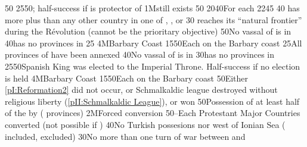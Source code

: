 {}{50}{}%
%
%
{25}{50}{; half-success if \paysmajeurSuede is
  protector of \paysPologne}%
%
%
\EUobjective1M{\payspologne still exists}{}%
{}{50}{}%
%
%
{20}{40}{For each }%
%
%
{22}{45}{\EUobjIndependanceWars}%
%
%
{}{40}{ has more \TP plus \COL than any other country in
  one of , , or
  }%
%
%
%
{}{30}{ reaches its ``natural frontier'' during the
  Révolution (cannot be the prioritary objective)}%
%
 
%
%
{}{50}{No vassal of \paysmajeurFrance is in \regionItalie}%
%
%
{}{40}{\paysmajeurFrance has no provinces in \regionItalie}%
%
%
{}{25}{}%
%
\EUobjective4M{Barbary Coast}{\Presidio}%
{15}{50}{Each \Presidio on the Barbary coast}%
%
%
{}{25}{All provinces of \paysprovincesne have been annexed}%
%
%
%
{}{40}{No vassal of \paysmajeurFrance is in \regionItalie}%
%
%
{}{30}{\paysmajeurFrance has no provinces in \regionItalie}%
%
%
{25}{50}{Spanish King was elected to the Imperial Throne. Half-success if no
  election is held}%
%
\EUobjective4M{Barbary Coast}{\Presidio}%
{15}{50}{Each \Presidio on the Barbary coast}%
%
%
{}{50}{Either \ref{pI:Reformation2} did not occur, or Schmalkaldic league
  destroyed without religious liberty (\ref{pII:Schmalkaldic League}),
  or  won}%
%
%
%
{}{50}{Possession of at least half of the \payshongrie by \AUSaus (
  provinces)}%
%
\EUobjective2M{Forced conversion}{\MAJ}%
{50}{--}{Each Protestant Major Countries converted (not possible if \CATHCO)}%
%
%
{}{40}{No Turkish possesions nor \VASSAL west of Ionian Sea
  ( included, \paystripoli excluded)}%
%
%
{}{30}{No more than one turn of war between  and
  }%
